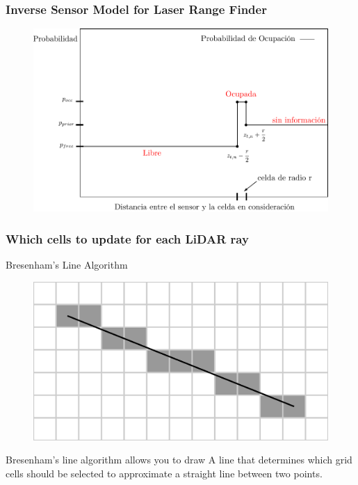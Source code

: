     \begin{frame}
    \frametitle{Inverse Sensor Model for Laser Range Finder}
    
    \begin{figure}[!h]
    \includegraphics[width=0.8\columnwidth]{./images/inverse_senor_model_range_finder.pdf}
    \end{figure}
    
    \end{frame}
    
    \begin{frame}
    \frametitle{Which cells to update for each LiDAR ray}
    Bresenham's Line Algorithm
    \begin{figure}[!h]
    \includegraphics[width=0.6\columnwidth]{./images/bresenham.pdf}
    \end{figure}
    
    Bresenham's line algorithm allows you to draw A line that determines which grid cells should be selected to approximate a straight line between two points.
    
    \end{frame}
    
